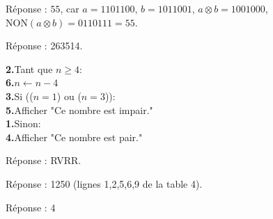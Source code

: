 \documentclass[class=report,crop=false, 12pt]{standalone}
\begin{document}
\begin{enigme}[Binaire]

Réponse : $55$, car $a = 1101100$, $b = 1011001$,
$a \otimes b = 1001000$, $\text{NON}(a\otimes b) = 0110111 = 55$.

\end{enigme}



\begin{enigme}[Boucles II]

Réponse : 263514.

\begin{center}
\begin{minipage}{0.8\textwidth}
\textbf{2.}\indentation Tant que $n\ge4$:\\
\textbf{6.}\indentation\indentation $n \leftarrow n - 4$\\
\textbf{3.}\indentation Si (($n=1$) ou  ($n=3$)):\\
\textbf{5.}\indentation\indentation Afficher "Ce nombre est impair."\\
\textbf{1.}\indentation Sinon:\\
\textbf{4.}\indentation\indentation Afficher "Ce nombre est pair."\\
\end{minipage}
\end{center} 


\end{enigme}


\begin{enigme}[Graphe]


Réponse : RVRR.



\end{enigme}




\begin{enigme}

Réponse : 1250 (lignes 1,2,5,6,9 de la table 4).

\end{enigme}




\begin{enigme}[Pixels]

Réponse : 4


\end{enigme}
\end{document}
